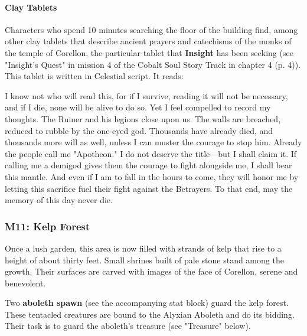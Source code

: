 \documentclass[letterpaper, 11pt, bg=full, twocolumn]{dndbook}
\begin{document}
\paragraph{Clay Tablets}

Characters who spend 10 minutes searching the floor of the building find, among other clay tablets that describe ancient prayers and catechisms of the monks of the temple of Corellon, the particular tablet that \textbf{Insight} has been seeking (see "Insight's Quest" in mission 4 of the Cobalt Soul Story Track in chapter 4 (p. 4)). This tablet is written in Celestial script. It reads:

\begin{DndReadAloud}
I know not who will read this, for if I survive, reading it will not be necessary, and if I die, none will be alive to do so. Yet I feel compelled to record my thoughts. The Ruiner and his legions close upon us. The walls are breached, reduced to rubble by the one-eyed god. Thousands have already died, and thousands more will as well, unless I can muster the courage to stop him.
Already the people call me "Apotheon." I do not deserve the title---but I shall claim it. If calling me a demigod gives them the courage to fight alongside me, I shall bear this mantle. And even if I am to fall in the hours to come, they will honor me by letting this sacrifice fuel their fight against the Betrayers. To that end, may the memory of this day never die.
\end{DndReadAloud}

\subsubsection{M11: Kelp Forest}


\begin{DndReadAloud}
Once a lush garden, this area is now filled with strands of kelp that rise to a height of about thirty feet. Small shrines built of pale stone stand among the growth. Their surfaces are carved with images of the face of Corellon, serene and benevolent.
\end{DndReadAloud}

Two \textbf{aboleth spawn} (see the accompanying stat block) guard the kelp forest. These tentacled creatures are bound to the Alyxian Aboleth and do its bidding. Their task is to guard the aboleth's treasure (see "Treasure" below).
\end{document}
